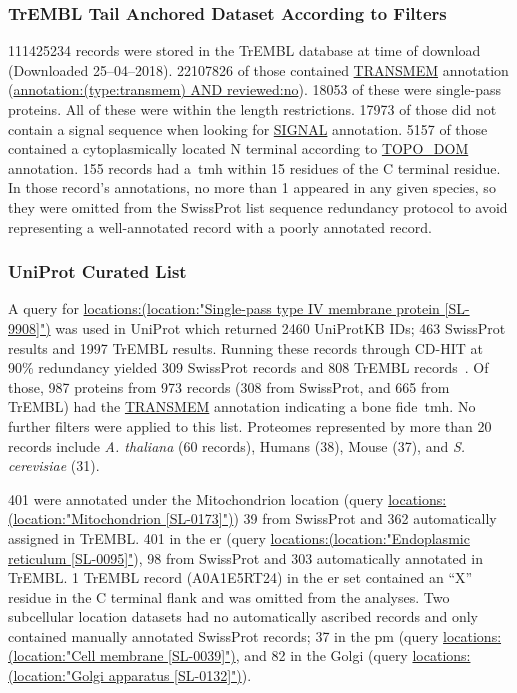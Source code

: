 \subsubsection{TrEMBL Tail Anchored Dataset According to Filters}
111425234 records were stored in the TrEMBL database at time of download (Downloaded 25--04--2018).
22107826 of those contained \url{TRANSMEM} annotation (\url{annotation:(type:transmem) AND reviewed:no}).
18053 of these were single-pass proteins.
All of these were within the length restrictions.
17973 of those did not contain a signal sequence when looking for \url{SIGNAL} annotation.
5157 of those contained a cytoplasmically located N terminal according to \url{TOPO_DOM} annotation.
155 records had a~\gls{tmh} within 15 residues of the C terminal residue.
In those record's annotations, no more than 1 appeared in any given species, so they were omitted from the SwissProt list sequence redundancy protocol to avoid representing a well-annotated record with a poorly annotated record.

\subsubsection{UniProt Curated List}
A query for \url{locations:(location:"Single-pass type IV membrane protein [SL-9908]")} was used in UniProt which returned 2460 UniProtKB IDs; 463 SwissProt results and 1997 TrEMBL results.
Running these records through CD-HIT at 90\% redundancy yielded 309 SwissProt records and 808 TrEMBL records~\cite{Huang2010, Wu2011}.
Of those, 987 proteins from 973 records (308 from SwissProt, and 665 from TrEMBL) had the \url{TRANSMEM} annotation indicating a bone fide~\gls{tmh}.
No further filters were applied to this list.
Proteomes represented by more than 20 records include \textit{A. thaliana} (60 records), Humans (38), Mouse (37), and \textit{S. cerevisiae} (31). %

401 were annotated under the Mitochondrion location (query \url{locations:(location:"Mitochondrion [SL-0173]")}) 39 from SwissProt and 362 automatically assigned in TrEMBL.
401 in the \gls{er} (query \url{locations:(location:"Endoplasmic reticulum [SL-0095]"}), 98 from SwissProt and 303 automatically annotated in TrEMBL.
1 TrEMBL record (A0A1E5RT24) in the \gls{er} set contained an ``X'' residue in the C terminal flank and was omitted from the analyses.
Two subcellular location datasets had no automatically ascribed records and only contained manually annotated SwissProt records; 37 in the \gls{pm} (query \url{locations:(location:"Cell membrane [SL-0039]")}, and 82 in the Golgi (query \url{locations:(location:"Golgi apparatus [SL-0132]")}).

